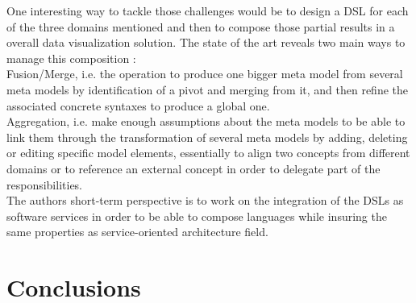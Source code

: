 \documentclass{acm_proc_article-sp}
\begin{document}
One interesting way to tackle those challenges would be to design a
DSL for each of the three domains mentioned and then to compose those
partial results in a overall data visualization solution.
The state of the art reveals two main ways to manage this composition :\\
 Fusion/Merge, i.e. the operation to produce one bigger meta
model from several meta models by identification of a pivot and
merging from it, and
then refine the associated concrete syntaxes to produce a global one. \cite{?}\\
 Aggregation, i.e. make enough assumptions about the meta models to be able to link them through the transformation of several meta models by adding, deleting or editing specific model elements, essentially to align two concepts from different domains or to reference an external concept in order to delegate part of the responsibilities. \cite{?}\\
The authors short-term perspective is to work on the integration of
the DSLs as software services in order to be able to compose languages
while insuring the same properties as service-oriented architecture
field.

\section{Conclusions}





%
\end{document}
